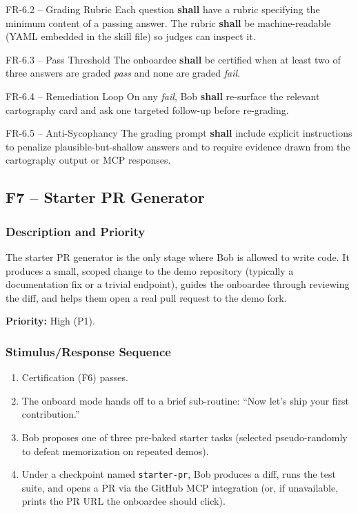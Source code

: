 \documentclass[11pt,letterpaper]{article}
\newcommand{\shall}{\textbf{shall}}
\begin{document}
\begin{reqbox}{FR-6.2 -- Grading Rubric}
Each question \shall{} have a rubric specifying the minimum content of a passing answer. The rubric \shall{} be machine-readable (YAML embedded in the skill file) so judges can inspect it.
\end{reqbox}

\begin{reqbox}{FR-6.3 -- Pass Threshold}
The onboardee \shall{} be certified when at least two of three answers are graded \textit{pass} and none are graded \textit{fail}.
\end{reqbox}

\begin{reqbox}{FR-6.4 -- Remediation Loop}
On any \textit{fail}, Bob \shall{} re-surface the relevant cartography card and ask one targeted follow-up before re-grading.
\end{reqbox}

\begin{reqbox}{FR-6.5 -- Anti-Sycophancy}
The grading prompt \shall{} include explicit instructions to penalize plausible-but-shallow answers and to require evidence drawn from the cartography output or MCP responses.
\end{reqbox}

\subsection{F7 -- Starter PR Generator}

\subsubsection{Description and Priority}

The starter PR generator is the only stage where Bob is allowed to write code. It produces a small, scoped change to the demo repository (typically a documentation fix or a trivial endpoint), guides the onboardee through reviewing the diff, and helps them open a real pull request to the demo fork.

\textbf{Priority:} High (P1).

\subsubsection{Stimulus/Response Sequence}

\begin{enumerate}
  \item Certification (F6) passes.
  \item The onboard mode hands off to a brief sub-routine: ``Now let's ship your first contribution.''
  \item Bob proposes one of three pre-baked starter tasks (selected pseudo-randomly to defeat memorization on repeated demos).
  \item Under a checkpoint named \texttt{starter-pr}, Bob produces a diff, runs the test suite, and opens a PR via the GitHub MCP integration (or, if unavailable, prints the PR URL the onboardee should click).
\end{enumerate}
\end{document}
